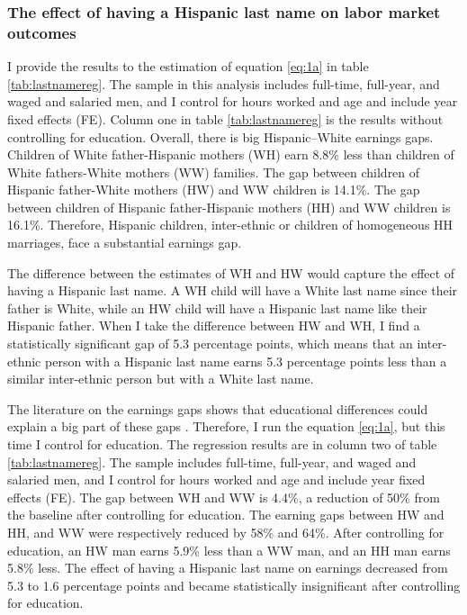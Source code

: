 \documentclass[12pt, fullpage]{article}
\begin{document}
\subsubsection{The effect of having a Hispanic last name on labor market outcomes}

I provide the results to the estimation of equation \ref{eq:1a} in table \ref{tab:lastnamereg}. The sample in this analysis includes full-time, full-year, and waged and salaried men, and I control for hours worked and age and include year fixed effects (FE). Column one in table \ref{tab:lastnamereg} is the results without controlling for education. Overall, there is big Hispanic--White earnings gaps. Children of White father-Hispanic mothers (WH) earn 8.8\% less than children of White fathers-White mothers (WW) families. The gap between children of Hispanic father-White mothers (HW) and WW children is 14.1\%. The gap between children of Hispanic father-Hispanic mothers (HH) and WW children is 16.1\%. Therefore, Hispanic children, inter-ethnic or children of homogeneous HH marriages, face a substantial earnings gap.

The difference between the estimates of WH and HW would capture the effect of having a Hispanic last name. A WH child will have a White last name since their father is White, while an HW child will have a Hispanic last name like their Hispanic father. When I take the difference between HW and WH, I find a statistically significant gap of 5.3 percentage points, which means that an inter-ethnic person with a Hispanic last name earns 5.3 percentage points less than a similar inter-ethnic person but with a White last name.

The literature on the earnings gaps shows that educational differences could explain a big part of these gaps \citep{duncan2006hispanics, duncan2017complexity, duncan2018identifying, duncan2020new}. Therefore, I run the equation \ref{eq:1a}, but this time I control for education. The regression results are in column two of table \ref{tab:lastnamereg}. The sample includes full-time, full-year, and waged and salaried men, and I control for hours worked and age and include year fixed effects (FE). The gap between WH and WW is 4.4\%, a reduction of 50\% from the baseline after controlling for education. The earning gaps between HW and HH, and WW were respectively reduced by 58\% and 64\%. After controlling for education, an HW man earns 5.9\% less than a WW man, and an HH man earns 5.8\% less. The effect of having a Hispanic last name on earnings decreased from 5.3 to 1.6 percentage points and became statistically insignificant after controlling for education.
\end{document}

